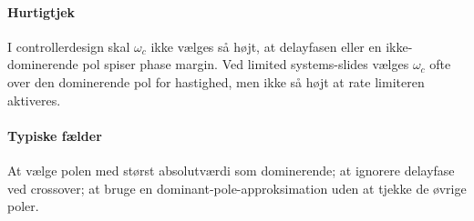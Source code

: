 \paragraph{Hurtigtjek}
I controllerdesign skal \(\omega_c\) ikke vælges så højt, at delayfasen eller en
ikke-dominerende pol spiser phase margin. Ved limited systems-slides vælges
\(\omega_c\) ofte over den dominerende pol for hastighed, men ikke så højt at rate
limiteren aktiveres.

\paragraph{Typiske fælder}
At vælge polen med størst absolutværdi som dominerende; at ignorere delayfase ved
crossover; at bruge en dominant-pole-approksimation uden at tjekke de øvrige poler.
